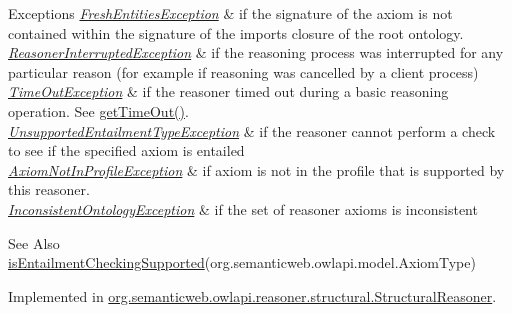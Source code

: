 \begin{DoxyExceptions}{Exceptions}
{\em \hyperlink{classorg_1_1semanticweb_1_1owlapi_1_1reasoner_1_1_fresh_entities_exception}{Fresh\-Entities\-Exception}} & if the signature of the axiom is not contained within the signature of the imports closure of the root ontology. \\
\hline
{\em \hyperlink{classorg_1_1semanticweb_1_1owlapi_1_1reasoner_1_1_reasoner_interrupted_exception}{Reasoner\-Interrupted\-Exception}} & if the reasoning process was interrupted for any particular reason (for example if reasoning was cancelled by a client process) \\
\hline
{\em \hyperlink{classorg_1_1semanticweb_1_1owlapi_1_1reasoner_1_1_time_out_exception}{Time\-Out\-Exception}} & if the reasoner timed out during a basic reasoning operation. See \hyperlink{interfaceorg_1_1semanticweb_1_1owlapi_1_1reasoner_1_1_o_w_l_reasoner_a44b2c968f989afe5290db29c90faa164}{get\-Time\-Out()}. \\
\hline
{\em \hyperlink{classorg_1_1semanticweb_1_1owlapi_1_1reasoner_1_1_unsupported_entailment_type_exception}{Unsupported\-Entailment\-Type\-Exception}} & if the reasoner cannot perform a check to see if the specified axiom is entailed \\
\hline
{\em \hyperlink{classorg_1_1semanticweb_1_1owlapi_1_1reasoner_1_1_axiom_not_in_profile_exception}{Axiom\-Not\-In\-Profile\-Exception}} & if {\ttfamily axiom} is not in the profile that is supported by this reasoner. \\
\hline
{\em \hyperlink{classorg_1_1semanticweb_1_1owlapi_1_1reasoner_1_1_inconsistent_ontology_exception}{Inconsistent\-Ontology\-Exception}} & if the set of reasoner axioms is inconsistent \\
\hline
\end{DoxyExceptions}
\begin{DoxySeeAlso}{See Also}
\hyperlink{interfaceorg_1_1semanticweb_1_1owlapi_1_1reasoner_1_1_o_w_l_reasoner_ada02e7fc9aed4a3df8c0bfecc3917aa9}{is\-Entailment\-Checking\-Supported}(org.\-semanticweb.\-owlapi.\-model.\-Axiom\-Type) 
\end{DoxySeeAlso}


Implemented in \hyperlink{classorg_1_1semanticweb_1_1owlapi_1_1reasoner_1_1structural_1_1_structural_reasoner_af631678044aecb32065f6bab9d92d790}{org.\-semanticweb.\-owlapi.\-reasoner.\-structural.\-Structural\-Reasoner}.

